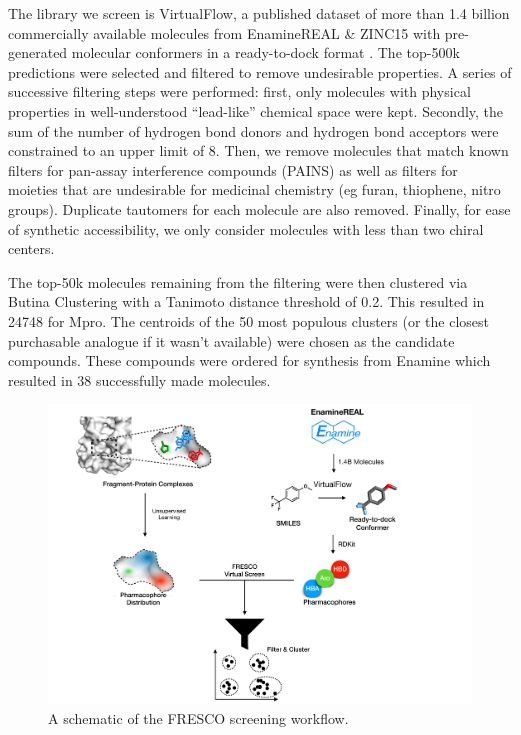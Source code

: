 The library we screen is VirtualFlow, a published dataset of more than 1.4 billion commercially available molecules from EnamineREAL \& ZINC15 with pre-generated molecular conformers in a ready-to-dock format \cite{Gorgulla2020VirtualFlow}. The top-500k predictions were selected and filtered to remove undesirable properties. A series of successive filtering steps were performed: first, only molecules with physical properties in well-understood ``lead-like'' chemical space \cite{ChemSpace} were kept. Secondly, the sum of the number of hydrogen bond donors and hydrogen bond acceptors were constrained to an upper limit of 8. Then, we remove molecules that match known filters for pan-assay interference compounds (PAINS) \cite{Baell2010Pains} as well as filters for moieties that are undesirable for medicinal chemistry (eg furan, thiophene, nitro groups). Duplicate tautomers for each molecule are also removed. Finally, for ease of synthetic accessibility, we only consider molecules with less than two chiral centers.

The top-50k molecules remaining from the filtering were then clustered via Butina Clustering \cite{Butina1999Clustering} with a Tanimoto distance threshold of 0.2. This resulted in 24748 for Mpro. The centroids of the 50 most populous clusters (or the closest purchasable analogue if it wasn't available) were chosen as the candidate compounds. These compounds were ordered for synthesis from Enamine which resulted in 38 successfully made molecules.



 \begin{figure}[th!]
    \centering
    \includegraphics[width=\linewidth]{Chapters/Fresco/Figs/flowchart_screening.pdf}
    \caption{A schematic of the FRESCO screening workflow.}
    \label{fig:screening_workflow}
\end{figure}

